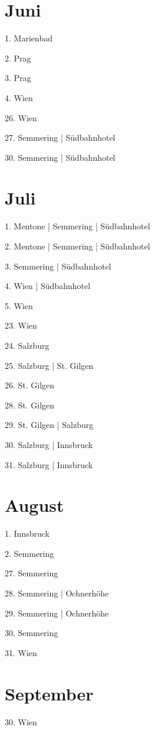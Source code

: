 \documentclass[twoside=false,titlepage=false,open=any, parskip=never, fontsize=10pt, headings=small, chapterprefix=false, appendixprefix=false, DIV=15]{scrbook}
\begin{document}
\begin{multicols}{3}
            \section*{Juni}
            1. Marienbad\par
            2. Prag\par
            3. Prag\par
            4. Wien\par
            26. Wien\par
            27. Semmering | Südbahnhotel\par
            30. Semmering | Südbahnhotel\par
            \section*{Juli}
            1. Mentone | Semmering | Südbahnhotel\par
            2. Mentone | Semmering | Südbahnhotel\par
            3. Semmering | Südbahnhotel\par
            4. Wien | Südbahnhotel\par
            5. Wien\par
            23. Wien\par
            24. Salzburg\par
            25. Salzburg | St. Gilgen\par
            26. St. Gilgen\par
            28. St. Gilgen\par
            29. St. Gilgen | Salzburg\par
            30. Salzburg | Innsbruck\par
            31. Salzburg | Innsbruck\par
            \section*{August}
            1. Innsbruck\par
            2. Semmering\par
            27. Semmering\par
            28. Semmering | Ochnerhöhe\par
            29. Semmering | Ochnerhöhe\par
            30. Semmering\par
            31. Wien\par
            \section*{September}
            30. Wien\par

\end{multicols}
\end{document}
